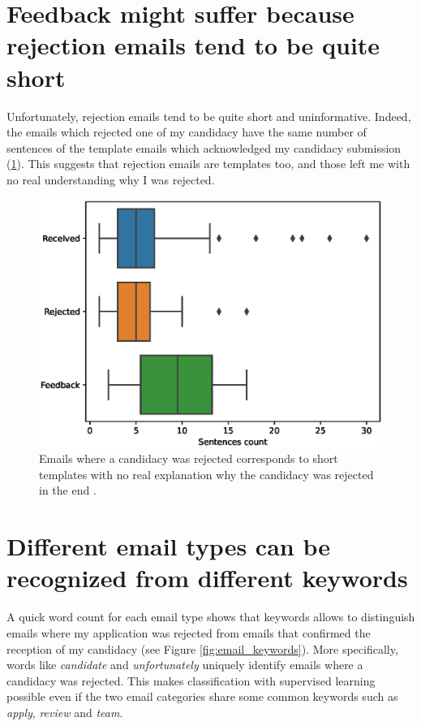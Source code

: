\documentclass[12pt]{article}
\begin{document}
\section{Feedback might suffer because rejection emails tend to be quite short}
Unfortunately, rejection emails tend to be quite short and uninformative. Indeed, the emails which rejected one of my candidacy have the same number of sentences of the template emails which acknowledged my candidacy submission (\ref{fig:email_lengths}). This suggests that rejection emails are templates too, and those left me with no real understanding why I was rejected.

\begin{figure}
\includegraphics[width = \linewidth]{message_length_distribution.eps}
\caption{Emails where a candidacy was rejected corresponds to short templates with no real explanation why the candidacy was rejected in the end . \label{fig:email_lengths}}
\end{figure}

\section{Different email types can be recognized from different keywords}
A quick word count for each email type shows that keywords allows to distinguish emails where my application was rejected  from emails that confirmed the reception of my candidacy (see Figure \ref{fig:email_keywords}). More specifically, words like \emph{candidate} and \emph{unfortunately} uniquely identify emails where a candidacy was rejected. This makes classification with supervised learning possible even if the two email categories share some common keywords such as \emph{apply}, \emph{review} and \emph{team}.
\end{document}
